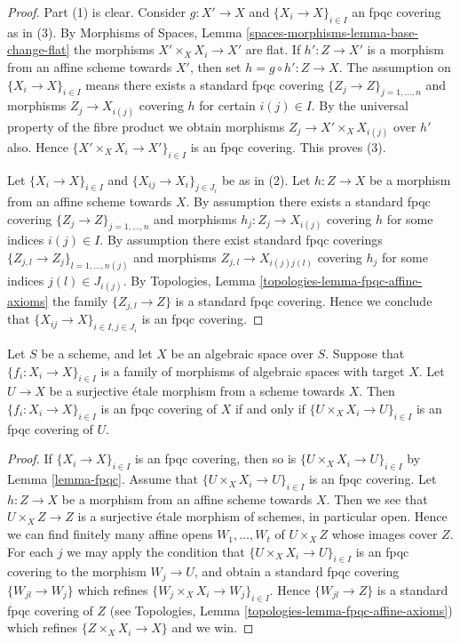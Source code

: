 \begin{proof}
Part (1) is clear. Consider $g : X' \to X$ and
$\{X_i \to X\}_{i\in I}$ an fpqc covering as in (3). By
Morphisms of Spaces, Lemma \ref{spaces-morphisms-lemma-base-change-flat}
the morphisms $X' \times_X X_i \to X'$
are flat. If $h' : Z \to X'$ is a morphism from an affine scheme
towards $X'$, then set $h = g \circ h' : Z \to X$. The assumption
on $\{X_i \to X\}_{i\in I}$ means there exists a standard fpqc covering
$\{Z_j \to Z\}_{j = 1, \ldots, n}$ and morphisms $Z_j \to X_{i(j)}$ covering
$h$ for certain $i(j) \in I$. By the universal property of the fibre product
we obtain morphisms $Z_j \to X' \times_X X_{i(j)}$ over $h'$ also.
Hence $\{X' \times_X X_i \to X'\}_{i\in I}$ is an fpqc covering.
This proves (3).

\medskip\noindent
Let $\{X_i \to X\}_{i\in I}$ and $\{X_{ij} \to X_i\}_{j\in J_i}$ be as
in (2). Let $h : Z \to X$ be a morphism from an affine scheme towards $X$.
By assumption there exists a standard fpqc covering
$\{Z_j \to Z\}_{j = 1, \ldots, n}$ and morphisms $h_j : Z_j \to X_{i(j)}$
covering $h$ for some indices $i(j) \in I$. By assumption there exist
standard fpqc coverings
$\{Z_{j, l} \to Z_j\}_{l = 1, \ldots, n(j)}$
and morphisms $Z_{j, l} \to X_{i(j)j(l)}$ covering
$h_j$ for some indices $j(l) \in J_{i(j)}$. By
Topologies, Lemma \ref{topologies-lemma-fpqc-affine-axioms}
the family $\{Z_{j, l} \to Z\}$ is a standard fpqc covering.
Hence we conclude that $\{X_{ij} \to X\}_{i \in I, j\in J_i}$
is an fpqc covering.
\end{proof}

\begin{lemma}
\label{lemma-recognize-fpqc-covering}
Let $S$ be a scheme, and let $X$ be an algebraic space over $S$.
Suppose that $\{f_i : X_i \to X\}_{i \in I}$ is a family of morphisms of
algebraic spaces with target $X$. Let $U \to X$ be a surjective
\'etale morphism from a scheme towards $X$. Then
$\{f_i : X_i \to X\}_{i \in I}$ is an fpqc covering of $X$ if and only
if $\{U \times_X X_i \to U\}_{i \in I}$ is an fpqc covering of $U$.
\end{lemma}

\begin{proof}
If $\{X_i \to X\}_{i \in I}$ is an fpqc covering, then so is
$\{U \times_X X_i \to U\}_{i \in I}$ by Lemma \ref{lemma-fpqc}.
Assume that $\{U \times_X X_i \to U\}_{i \in I}$ is an fpqc covering.
Let $h : Z \to X$ be a morphism from an affine scheme towards $X$.
Then we see that $U \times_X Z \to Z$ is a surjective \'etale morphism
of schemes, in particular open. Hence we can find finitely many affine opens
$W_1, \ldots, W_t$ of $U \times_X Z$ whose images cover $Z$.
For each $j$ we may apply the condition that
$\{U \times_X X_i \to U\}_{i \in I}$ is an fpqc covering
to the morphism $W_j \to U$, and obtain a standard fpqc covering
$\{W_{jl} \to W_j\}$ which refines $\{W_j \times_X X_i \to W_j\}_{i \in I}$.
Hence $\{W_{jl} \to Z\}$ is a standard fpqc covering of $Z$
(see
Topologies, Lemma \ref{topologies-lemma-fpqc-affine-axioms})
which refines $\{Z \times_X X_i \to X\}$ and we win.
\end{proof}

